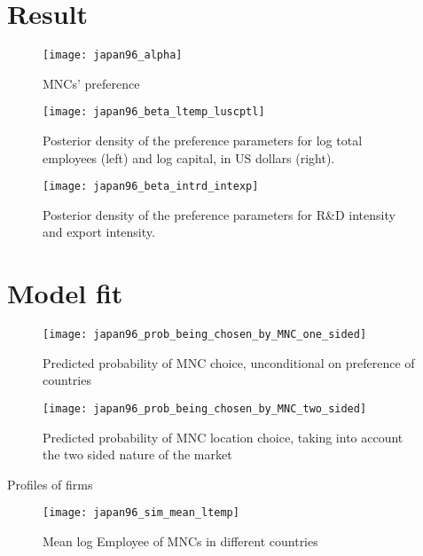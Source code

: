 \section{Result}
\label{sec:result}

\begin{figure}[!ht]
  \centering
  \texttt{[image: japan96\_alpha]}
  \caption{MNCs' preference}
  \label{fig:japan96_alpha}
\end{figure}

\begin{figure}[!ht]
  \centering
  \texttt{[image: japan96\_beta\_ltemp\_luscptl]}
  \caption{Posterior density of the preference parameters for log total
    employees (left) and log capital, in US dollars (right).}
  \label{fig:japan96_beta_ltemp_luscptl}
\end{figure}

\begin{figure}[!ht]
  \centering
  \texttt{[image: japan96\_beta\_intrd\_intexp]}
  \caption{Posterior density of the preference parameters for R\&D intensity and
    export intensity.}
  \label{fig:japan96_beta_intrd_intexp}
\end{figure}

\section{Model fit}
\label{sec:model_fit}

\begin{figure}[!ht]
  \centering
  \texttt{[image: japan96\_prob\_being\_chosen\_by\_MNC\_one\_sided]}
  \caption{Predicted probability of MNC choice, unconditional on preference of countries}
  \label{fig:japan96_prob_being_chosen_by_MNC_one_sided}
\end{figure}


\begin{figure}[!ht]
  \centering
  \texttt{[image: japan96\_prob\_being\_chosen\_by\_MNC\_two\_sided]}
  \caption{Predicted probability of MNC location choice, taking into account the
  two sided nature of the market}
  \label{fig:japan96_prob_being_chosen_by_MNC_two_sided}
\end{figure}

Profiles of firms

\begin{figure}[!ht]
  \centering
  \texttt{[image: japan96\_sim\_mean\_ltemp]}
  \caption{Mean log Employee of MNCs in different countries}
  \label{fig:japan96_sim_mean_ltemp}
\end{figure}

